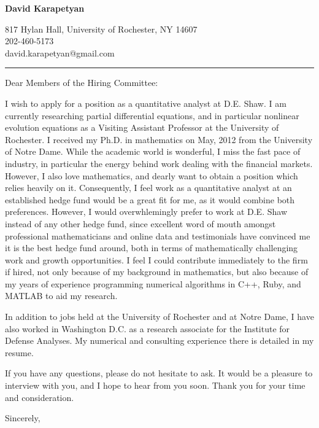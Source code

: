 \documentclass[12pt]{letter}
\date{\vspace{0.5cm}\flushleft}
\begin{document}
\begin{letter}{}
\begin{center}
{\bf {\Large David Karapetyan}}
\end{center}

\begin{center}
{817 Hylan Hall, University of Rochester, NY 14607  \\ 
202-460-5173 \\  david.karapetyan@gmail.com
}
\end{center}
\hrule

\opening{Dear Members of the Hiring Committee:\\}
%

%
I wish to apply for a position as a quantitative analyst at D.E. Shaw. I am currently researching partial differential equations, and in particular nonlinear
evolution equations as a Visiting Assistant Professor at the University of
Rochester. I received my Ph.D. in mathematics on May, 2012 from the University
of Notre Dame. While the academic world is wonderful, I miss the fast pace of
industry, in particular the energy behind work dealing with the
financial markets. However, I also love mathematics, and dearly want to obtain
a position which relies heavily on it. Consequently, I feel work as a
quantitative analyst at an established hedge fund would be a great fit for me, as it would combine both preferences. However, I would overwhlemingly prefer to work at D.E. Shaw instead of any other hedge fund, since excellent word of mouth amongst professional mathematicians and online data and testimonials have convinced me it
is the best hedge fund around, both in terms of mathematically challenging work and growth opportunities. I feel I could contribute immediately to the
firm if hired, not only because of my background in mathematics, but also
because of my years of experience programming numerical algorithms in C++,
Ruby, and MATLAB to aid my research. 

In addition to jobs held at the University of Rochester and at Notre Dame, I have
also worked in Washington D.C. as a research associate for the Institute
for Defense Analyses. My numerical and
consulting experience there is detailed in my resume. 

If you have any questions, please do not hesitate to ask. It would be a
pleasure to interview with you, and I hope to hear from you soon. Thank you for
your time and consideration. 

\closing{Sincerely,}


\end{letter}
\end{document}
